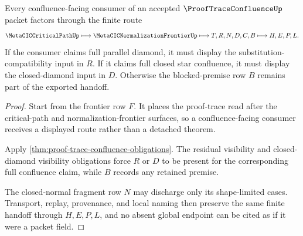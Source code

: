 \begin{theorem}
\label{thm:proof-trace-confluence-conditional-handoff}
Every confluence-facing consumer of an accepted $\ProofTraceConfluenceUp$ packet factors through the finite route
$$
\MetaCICCriticalPathUp \longmapsto \MetaCICNormalizationFrontierUp \longmapsto T,R,N,D,C,B \longmapsto H,E,P,L .
$$
If the consumer claims full parallel diamond, it must display the substitution-compatibility input in $R$. If it claims full closed star confluence, it must display the closed-diamond input in $D$. Otherwise the blocked-premise row $B$ remains part of the exported handoff.
\end{theorem}
\begin{proof}
Start from the frontier row $F$. It places the proof-trace read after the critical-path and normalization-frontier surfaces, so a confluence-facing consumer receives a displayed route rather than a detached theorem.

Apply \autoref{thm:proof-trace-confluence-obligations}. The residual visibility and closed-diamond visibility obligations force $R$ or $D$ to be present for the corresponding full confluence claim, while $B$ records any retained premise.

The closed-normal fragment row $N$ may discharge only its shape-limited cases. Transport, replay, provenance, and local naming then preserve the same finite handoff through $H,E,P,L$, and no absent global endpoint can be cited as if it were a packet field.
\end{proof}



